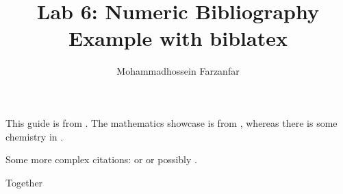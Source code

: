 \documentclass{article}
\author{Mohammadhossein Farzanfar}
\title{Lab 6: Numeric Bibliography Example with biblatex}
\begin{document}
\maketitle
This guide is from \cite{Kulyabov2023}. The mathematics showcase is from \cite{Graham1995}, whereas there is some chemistry in \cite{Thomas2008}.

Some more complex citations: \parencite{Kulyabov2023} or \textcite{Thomas2008} or possibly .

\autocite[56]{Thomas2008}

\autocite[See][45-48]{Graham1995}

Together \cite{Kulyabov2023,Thomas2008,Graham1995}

\printbibliography
\end{document}
